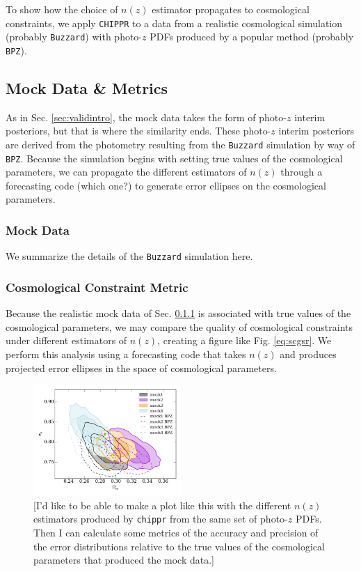 \documentclass[iop]{emulateapj}
\newcommand{\chippr}{\texttt{CHIPPR} }
\begin{document}
To show how the choice of $n(z)$ estimator propagates to cosmological 
constraints, we apply \chippr to a data from a realistic cosmological 
simulation (probably \texttt{Buzzard}) with photo-$z$ PDFs produced by a 
popular method (probably \texttt{BPZ}).

\subsection{Mock Data \& Metrics}
\label{sec:appintro}

As in Sec. \ref{sec:validintro}, the mock data takes the form of photo-$z$ 
interim posteriors, but that is where the similarity ends.  These photo-$z$ 
interim posteriors are derived from the photometry resulting from the 
\texttt{Buzzard} simulation by way of \texttt{BPZ}.  Because the simulation 
begins with setting true values of the cosmological parameters, we can 
propagate the different estimators of $n(z)$ through a forecasting code (which 
one?) to generate error ellipses on the cosmological parameters.

\subsubsection{Mock Data}
\label{sec:buzzard}

We summarize the details of the \texttt{Buzzard} simulation here.

\subsubsection{Cosmological Constraint Metric}
\label{sec:cosmo}

Because the realistic mock data of Sec. \ref{sec:buzzard} is associated with 
true values of the cosmological parameters, we may compare the quality of 
cosmological constraints under different estimators of $n(z)$, creating a 
figure like Fig. \ref{eq:scgsr}.  We perform this analysis using a forecasting 
code that takes $n(z)$ and produces projected error ellipses in the space of 
cosmological parameters.  

\begin{figure}
	\begin{center}
		\includegraphics[width=0.5\textwidth]{cosmo_constraints.png}
		\caption{[I'd like to be able to make a plot like this with the 
different $n(z)$ estimators produced by \texttt{chippr} from the same set of 
photo-$z$ PDFs.  Then I can calculate some metrics of the accuracy and 
precision of the error distributions relative to the true values of the 
cosmological parameters that produced the mock data.]}
		\label{fig:scgsr}
	\end{center}
\end{figure}
\end{document}
